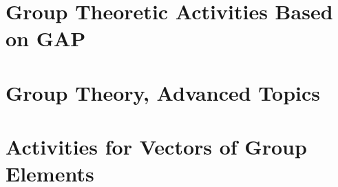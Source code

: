 \bigskip


\clearpage

\section{Group Theoretic Activities Based on GAP}
\label{sec:group:GAP}



\bigskip


\clearpage


\section{Group Theory, Advanced Topics}
\label{sec:lineargroups:advanced:topics}



\bigskip


\clearpage



\section{Activities for Vectors of Group Elements}
\label{sec:lineargroups:vectorge:activity}



\bigskip


\clearpage



